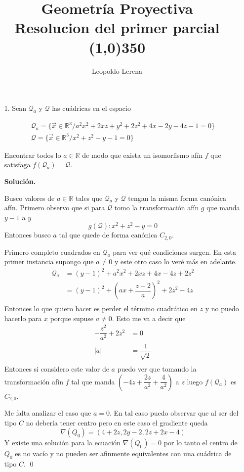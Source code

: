 \documentclass{article}
\title{Geometría Proyectiva \\ \large Resolucion del primer parcial \\\line(1,0){350}}
\author{Leopoldo Lerena }
\newcommand{\R}{\mathbb R}
\begin{document}
\maketitle
\begin{itemize}
	\item [1.] Sean $\mathcal{Q}_a$ y $\mathcal{Q}$ las cuádricas en el espacio 

	\begin{align*}
	\mathcal{Q}_a=\{\vec{x} \in \mathbb{R}^3/ a^2x^2+2xz+y^2+2z^2+4x-2y-4z-1=0 \} \\
	\mathcal{Q}=\{\vec{x} \in \mathbb{R}^3/x^2+z^2-y-1=0 \}
	\end{align*}
	
	Encontrar todos lo $a \in \mathbb{R}$ de modo que exista un isomorfismo afín $f$ que satisfaga $f(\mathcal{Q}_a)=\mathcal{Q}$.
	
	\textbf{Solución.}
	
	Busco valores de $a \in \R$ tales que $\mathcal{Q}_a$ y $\mathcal{Q}$ tengan la misma forma canónica afín. Primero observo que si para $\mathcal{Q}$ tomo la transformación afín $g$ que manda $y-1$ a $y$ 
	\[g(\mathcal{Q}): x^2 +z^2 -y = 0\]
	Entonces busco $a$ tal que quede de forma canónica $C_{2,0}.$
	
	Primero completo cuadrados en $\mathcal{Q}_a$ para ver qué condiciones surgen. En esta primer instancia supongo que $a \neq 0$ y este otro caso lo veré más en adelante.
	\begin{align*}
	\mathcal{Q}_a &= (y-1)^2+a^2x^2+2xz+4x-4z+2z^2 \\
	&= (y-1)^2 +(ax + \dfrac{z+2}{a})^2 + 2z^2 -4z \\
	\end{align*}
	Entonces lo que quiero hacer es perder el término cuadrático en $z$ y no puedo hacerlo para $x$ porque supuse $a \neq 0$. Esto me va a decir que 
	\begin{align*}
	-\dfrac{z^2}{a^2} + 2z^2 &= 0 \\
	|a| &= \dfrac{1}{\sqrt 2} \\
	\end{align*}
	Entonces si considero este valor de $a$ puedo ver que tomando la transformación afín $f$ tal que manda $(-4z+\dfrac{2z}{a^2}+\dfrac{4}{a^2})$ a $z$ luego $f(\mathcal{Q}_a)$ es $C_{2,0}$.
	
	Me falta analizar el caso que $a=0$. En tal caso puedo observar que al ser del tipo $C$ no debería tener centro pero en este caso el gradiente queda
	\[ \nabla(Q_0) = (4+2z,2y-2,2z+2x-4) \]
	Y existe una solución para la ecuación $\nabla(Q_0) = 0$ por lo tanto el centro de $Q_0$ es no vacío y no pueden ser afinmente equivalentes con una cuádrica de tipo $C$. \qed
	

\end{itemize}
\end{document}
